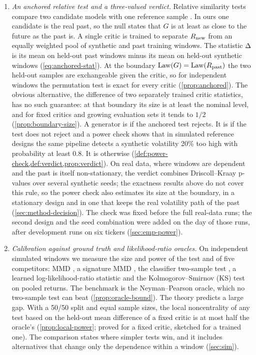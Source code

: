 \begin{enumerate}
  \item \emph{An anchored relative test and a three-valued verdict.} Relative similarity tests
  compare two candidate models with one reference sample \citep{bounliphone2016test}. In ours one
  candidate is the real past, so the null states that $G$ is at least as close to the future as
  the past is. A single critic is trained to separate $R_{\mathrm{new}}$ from an equally weighted pool of
  synthetic and past training windows. The statistic $\Delta$ is its mean on held-out past windows
  minus its mean on held-out synthetic windows (\cref{eq:anchored-stat}). At the boundary
  $\operatorname{Law}(G)=\operatorname{Law}(R_{\mathrm{past}})$ the two held-out samples are exchangeable given the critic, so for
  independent windows the permutation test is exact for every critic (\cref{prop:anchored}). The
  obvious alternative, the difference of two separately trained critic statistics, has no such
  guarantee: at that boundary its size is at least the nominal level, and for fixed critics and
  growing evaluation sets it tends to $1/2$ (\cref{prop:boundary-size}). A generator is \BAD{} if
  the anchored test rejects. It is \GOOD{} if the test does not reject and a power check shows
  that in simulated reference designs the same pipeline detects a synthetic volatility 20\% too
  high with probability at least $0.8$. It is \INCONCL{} otherwise
  (\cref{def:power-check,def:verdict,prop:verdict}). On real data, where windows are dependent and
  the past is itself non-stationary, the verdict combines Driscoll--Kraay p-values over several
  synthetic seeds; the exactness results above do not cover this rule, so the power check also
  estimates its size at the boundary, in a stationary design and in one that keeps the real
  volatility path of the past (\cref{sec:method-decision}). The check was fixed before the full
  real-data runs; the second design and the seed combination were added on the day of those runs,
  after development runs on six tickers (\cref{sec:emp-power}).

  \item \emph{Calibration against ground truth and likelihood-ratio oracles.} On independent
  simulated windows we measure the size and power of the \WC{} test and of five competitors: MMD
  \citep{gretton2012kernel}, a signature MMD \citep{chevyrev2022signature}, the classifier
  two-sample test \citep[C2ST;][]{lopezpaz2017revisiting}, a learned log-likelihood-ratio
  statistic \citep[\LRC{};][]{cheng2022classification} and the Kolmogorov--Smirnov (KS) test on
  pooled returns. The benchmark is the Neyman--Pearson oracle, which no two-sample test can beat
  (\cref{prop:oracle-bound}). The theory predicts a large gap. With a 50/50 split and equal sample
  sizes, the local noncentrality of any test based on the held-out mean difference of a fixed
critic is at most half the oracle's
  (\cref{prop:local-power}; proved for a fixed critic, sketched for a trained one). The comparison
  states where simpler tests win, and it includes alternatives that change only the dependence
  within a window (\cref{sec:sim}).


\end{enumerate}
